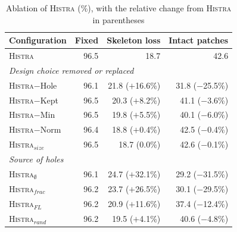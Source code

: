 \documentclass[10pt,conference]{IEEEtran}
\begin{document}
\begin{table}[h]
\caption{Ablation of \textsc{Histra} (\%), with the relative change from \textsc{Histra} in parentheses}
\label{tab:ablation}
\centering
\footnotesize
\begin{tabular}{l|r|r|r}
\toprule
\textbf{Configuration} & \textbf{Fixed} & \textbf{Skeleton loss} & \textbf{Intact patches} \\
\midrule\midrule
\textsc{Histra} & 96.5 & 18.7 & 42.6 \\
\midrule
\multicolumn{4}{l}{\textit{Design choice removed or replaced}} \\
\textsc{Histra}$-$Hole & 96.1 & 21.8 ($+$16.6\%) & 31.8 ($-$25.5\%) \\
\textsc{Histra}$-$Kept & 96.5 & 20.3 ($+$8.2\%) & 41.1 ($-$3.6\%) \\
\textsc{Histra}$-$Min & 96.5 & 19.8 ($+$5.5\%) & 40.1 ($-$6.0\%) \\
\textsc{Histra}$-$Norm & 96.4 & 18.8 ($+$0.4\%) & 42.5 ($-$0.4\%) \\
\textsc{Histra}$_{\mathit{size}}$ & 96.5 & 18.7 (0.0\%) & 42.6 ($-$0.1\%) \\
\midrule
\multicolumn{4}{l}{\textit{Source of holes}} \\
\textsc{Histra}$_{\emptyset}$ & 96.1 & 24.7 ($+$32.1\%) & 29.2 ($-$31.5\%) \\
\textsc{Histra}$_{\mathit{frac}}$ & 96.2 & 23.7 ($+$26.5\%) & 30.1 ($-$29.5\%) \\
\textsc{Histra}$_{\mathit{FL}}$ & 96.2 & 20.9 ($+$11.6\%) & 37.4 ($-$12.4\%) \\
\textsc{Histra}$_{\mathit{rand}}$ & 96.2 & 19.5 ($+$4.1\%) & 40.6 ($-$4.8\%) \\
\bottomrule
\end{tabular}
\end{table}
\end{document}

